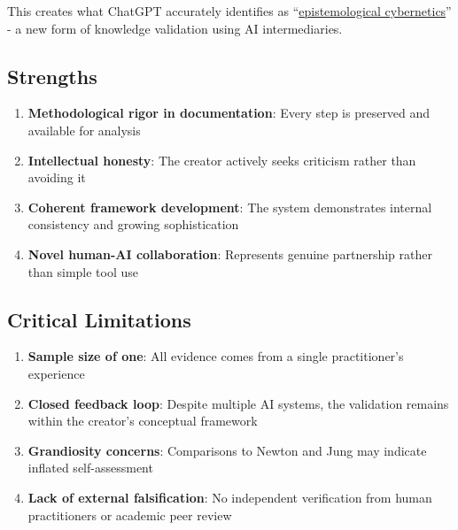 \documentclass{article}
\begin{document}
This creates what ChatGPT accurately identifies as ``\hyperlink{gloss:epistemological_cybernetics}{epistemological cybernetics}'' - a new form of knowledge validation using AI intermediaries.

\subsection*{Strengths}\label{strengths-4}

\begin{enumerate}
\item \textbf{Methodological rigor in documentation}: Every step is preserved and available for analysis\\
\item \textbf{Intellectual honesty}: The creator actively seeks criticism rather than avoiding it\\
\item \textbf{Coherent framework development}: The system demonstrates internal consistency and growing sophistication\\
\item \textbf{Novel human-AI collaboration}: Represents genuine partnership rather than simple tool use
\end{enumerate}

\subsection*{Critical Limitations}\label{critical-limitations-1}

\begin{enumerate}
\item \textbf{Sample size of one}: All evidence comes from a single practitioner's experience\\
\item \textbf{Closed feedback loop}: Despite multiple AI systems, the validation remains within the creator's conceptual framework\\
\item \textbf{Grandiosity concerns}: Comparisons to Newton and Jung may indicate inflated self-assessment\\
\item \textbf{Lack of external falsification}: No independent verification from human practitioners or academic peer review
\end{enumerate}
\end{document}

